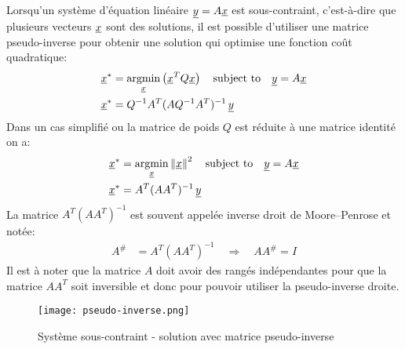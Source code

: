 Lorsqu'un système d'équation linéaire $\underline{y} = A \underline{x}$ est sous-contraint, c'est-à-dire que plusieurs vecteurs $\underline{x}$ sont des solutions, il est possible d'utiliser une matrice pseudo-inverse pour obtenir une solution qui optimise une fonction coût quadratique:
\begin{align}
\col{x}^* &= \operatornamewithlimits{argmin}\limits_{\col{x}} \left( \col{x}^T Q \col{x} \right) \quad \text{subject to} \quad \col{y} = A \col{x}  \\
\col{x}^* &= Q^{-1} A^T (A Q^{-1} A^T)^{-1} \, \col{y}
\end{align}
Dans un cas simplifié ou la matrice de poids $Q$ est réduite à une matrice identité on a:
\begin{align}
\col{x}^* &= \operatornamewithlimits{argmin}\limits_{\col{x}} \left\| \col{x} \right\|^2 \quad \text{subject to} \quad \col{y} = A \col{x}  \\
\col{x}^* &= A^T (A A^T)^{-1} \, \col{y}
\end{align}
La matrice $A^T (A A^T)^{-1}$ est souvent appelée inverse droit de Moore–Penrose et notée:
\begin{align}
A^{\#} &= A^T (A A^T)^{-1}  \quad \Rightarrow \quad A A^{\#} = I
\end{align}
Il est à noter que la matrice $A$ doit avoir des rangés indépendantes pour que la matrice $A A^T$ soit inversible et donc pour pouvoir utiliser la pseudo-inverse droite.

\begin{figure}[htbp]
	\centering
		\texttt{[image: pseudo-inverse.png]}
	\caption{Système sous-contraint - solution avec matrice pseudo-inverse}
	\label{fig:pseudo-inverse}
\end{figure}



